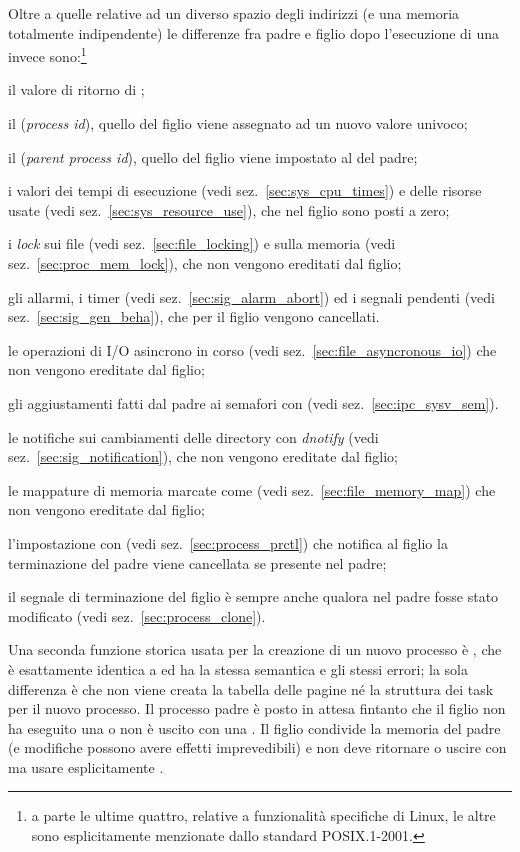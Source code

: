 Oltre a quelle relative ad un diverso spazio degli indirizzi (e una memoria
totalmente indipendente) le differenze fra padre e figlio dopo l'esecuzione di
una  invece sono:\footnote{a parte le ultime quattro, relative a
  funzionalità specifiche di Linux, le altre sono esplicitamente menzionate
  dallo standard POSIX.1-2001.}
\begin{itemize*}
\item il valore di ritorno di ;
\item il  (\textit{process id}), quello del figlio viene assegnato ad
  un nuovo valore univoco;
\item il  (\textit{parent process id}), quello del figlio viene
  impostato al  del padre;
\item i valori dei tempi di esecuzione (vedi sez.~\ref{sec:sys_cpu_times}) e
  delle risorse usate (vedi sez.~\ref{sec:sys_resource_use}), che nel figlio
  sono posti a zero;
\item i \textit{lock} sui file (vedi sez.~\ref{sec:file_locking}) e sulla
  memoria (vedi sez.~\ref{sec:proc_mem_lock}), che non vengono ereditati dal
  figlio;
\item gli allarmi, i timer (vedi sez.~\ref{sec:sig_alarm_abort}) ed i segnali
  pendenti (vedi sez.~\ref{sec:sig_gen_beha}), che per il figlio vengono
  cancellati.
\item le operazioni di I/O asincrono in corso (vedi
  sez.~\ref{sec:file_asyncronous_io}) che non vengono ereditate dal figlio;
\item gli aggiustamenti fatti dal padre ai semafori con  (vedi
  sez.~\ref{sec:ipc_sysv_sem}).
\item le notifiche sui cambiamenti delle directory con \textit{dnotify} (vedi
  sez.~\ref{sec:sig_notification}), che non vengono ereditate dal figlio;
\item le mappature di memoria marcate come  (vedi
  sez.~\ref{sec:file_memory_map}) che non vengono ereditate dal figlio;
\item l'impostazione con  (vedi sez.~\ref{sec:process_prctl}) che
  notifica al figlio la terminazione del padre viene cancellata se presente
  nel padre;
\item il segnale di terminazione del figlio è sempre  anche
  qualora nel padre fosse stato modificato (vedi sez.~\ref{sec:process_clone}). 
\end{itemize*}

Una seconda funzione storica usata per la creazione di un nuovo processo è
, che è esattamente identica a  ed ha la stessa
semantica e gli stessi errori; la sola differenza è che non viene creata la
tabella delle pagine né la struttura dei task per il nuovo processo. Il
processo padre è posto in attesa fintanto che il figlio non ha eseguito una
 o non è uscito con una . Il figlio condivide la
memoria del padre (e modifiche possono avere effetti imprevedibili) e non deve
ritornare o uscire con  ma usare esplicitamente .

